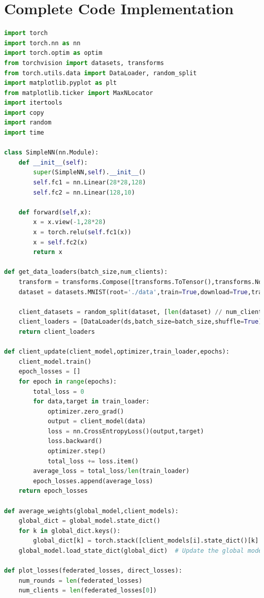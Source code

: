 \documentclass[a4paper,12pt]{article}
\begin{document}
\section{Complete Code Implementation} 
\begin{lstlisting}[language=Python, caption=Complete Code Implementation]
import torch
import torch.nn as nn
import torch.optim as optim
from torchvision import datasets, transforms
from torch.utils.data import DataLoader, random_split
import matplotlib.pyplot as plt
from matplotlib.ticker import MaxNLocator
import itertools
import copy
import random
import time

class SimpleNN(nn.Module):
    def __init__(self):
        super(SimpleNN,self).__init__()
        self.fc1 = nn.Linear(28*28,128)
        self.fc2 = nn.Linear(128,10)
    
    def forward(self,x):
        x = x.view(-1,28*28)
        x = torch.relu(self.fc1(x))
        x = self.fc2(x)
        return x
    
def get_data_loaders(batch_size,num_clients):
    transform = transforms.Compose([transforms.ToTensor(),transforms.Normalize((0.5,),(0.5,))])
    dataset = datasets.MNIST(root='./data',train=True,download=True,transform=transform)

    client_datasets = random_split(dataset, [len(dataset) // num_clients] * num_clients)
    client_loaders = [DataLoader(ds,batch_size=batch_size,shuffle=True) for ds in client_datasets]
    return client_loaders

def client_update(client_model,optimizer,train_loader,epochs):
    client_model.train()
    epoch_losses = []
    for epoch in range(epochs):
        total_loss = 0
        for data,target in train_loader:
            optimizer.zero_grad()
            output = client_model(data)
            loss = nn.CrossEntropyLoss()(output,target)
            loss.backward()
            optimizer.step()
            total_loss += loss.item()
        average_loss = total_loss/len(train_loader)
        epoch_losses.append(average_loss)
    return epoch_losses

def average_weights(global_model,client_models):
    global_dict = global_model.state_dict()
    for k in global_dict.keys():
        global_dict[k] = torch.stack([client_models[i].state_dict()[k].float() for i in range(len(client_models))],0).mean(0)
    global_model.load_state_dict(global_dict)  # Update the global model

def plot_losses(federated_losses, direct_losses):
    num_rounds = len(federated_losses)
    num_clients = len(federated_losses[0])
    

\end{lstlisting}
\end{document}
